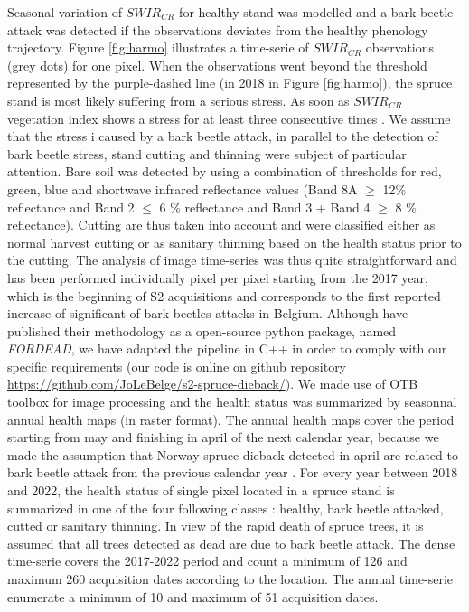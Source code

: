 \documentclass[3p,procedia]{elsarticle}
\begin{document}
Seasonal variation of $SWIR_{CR}$ for healthy stand was modelled and a bark beetle attack was detected if the observations deviates from the healthy phenology trajectory. 
Figure \ref{fig:harmo} illustrates a time-serie of $SWIR_{CR}$ observations (grey dots) for one pixel. 
When the observations went beyond the threshold represented by the purple-dashed line (in 2018 in Figure \ref{fig:harmo}), the spruce stand is most likely suffering from a serious stress.
As soon as $SWIR_{CR}$ vegetation index shows a stress for at least three consecutive times \cite{dutrieux_package_2021}.
We assume that the stress i caused by a bark beetle attack, in parallel to the detection of bark beetle stress, stand cutting and thinning were subject of particular attention. 
Bare soil was detected by using a combination of thresholds for red, green, blue and shortwave infrared reflectance values (Band 8A $\geq$ 12\% reflectance and Band 2 $\leq$ 6 \% reflectance and Band 3 + Band 4 $\geq$ 8 \% reflectance).
Cutting are thus taken into account and were classified either as normal harvest cutting or as sanitary thinning based on the health status prior to the cutting.
The analysis of image time-series was thus quite straightforward and has been performed individually pixel per pixel starting from the 2017 year, which is the beginning of S2 acquisitions and corresponds to the first reported increase of significant of bark beetles attacks in Belgium. 
Although \cite{dutrieux_package_2021} have published their methodology as a open-source python package, named \textit{FORDEAD}, we have adapted the pipeline in C++ in order to comply with our specific requirements (our code is online on github repository \url{https://github.com/JoLeBelge/s2-spruce-dieback/}). 
We made use of OTB toolbox \citep{grizonnet_2017_OTB} for image processing and the health status was summarized by seasonnal annual health maps (in raster format).
The annual health maps cover the period starting from may and finishing in april of the next calendar year, because we made the assumption that Norway spruce dieback detected in april are related to bark beetle attack from the previous calendar year \citep{muller_features_2022}.
For every year between 2018 and 2022, the health status of single pixel located in a spruce stand is summarized in one of the four following classes : healthy, bark beetle attacked, cutted or sanitary thinning.
In view of the rapid death of spruce trees, it is assumed that all trees detected as dead are due to bark beetle attack.
The dense time-serie covers the 2017-2022 period and count a minimum of 126 and maximum 260 acquisition dates according to the location. 
The annual time-serie enumerate a minimum of 10 and maximum of 51 acquisition dates. 
 
\end{document}
